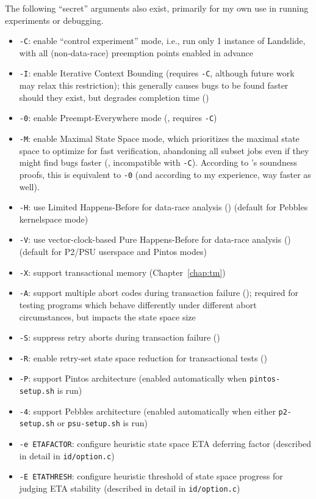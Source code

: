 The following ``secret'' arguments also exist, primarily for my own use in running experiments or debugging.

\begin{itemize}
	\item {\tt -C}: enable ``control experiment'' mode, i.e., run only 1 instance of Landslide, with all (non-data-race) preemption points enabled in advance
	\item {\tt -I}: enable Iterative Context Bounding (requires {\tt -C}, although future work may relax this restriction);
		this generally causes bugs to be found faster should they exist, but degrades completion time
		(\sect{\ref{sec:landslide-icb}})
	\item {\tt -0}: enable Preempt-Everywhere mode (\sect{\ref{sec:quicksand-eval}}, requires {\tt -C})
	\item {\tt -M}: enable Maximal State Space mode,
		which prioritizes the maximal state space to optimize for fast verification,
		abandoning all subset jobs even if they might find bugs faster
		(\sect{\ref{sec:tm-eval}}, incompatible with {\tt -C}).
		According to \sect{\ref{sec:quicksand-soundness}}'s soundness proofs,
		this is equivalent to {\tt -0}
		(and according to my experience, way faster as well).
	\item {\tt -H}: use Limited Happens-Before for data-race analysis (\sect{\ref{sec:background-hb}})
		(default for Pebbles kernelspace mode)
	\item {\tt -V}: use vector-clock-based Pure Happens-Before for data-race analysis (\sect{\ref{sec:background-hb}})
		(default for P2/PSU userspace and Pintos modes)
	\item {\tt -X}: support transactional memory (Chapter~\ref{chap:tm})
	\item {\tt -A}: support multiple abort codes during transaction failure (\sect{\ref{sec:tm-implementation}});
		required for testing programs which behave differently under different abort circumstances,
		but impacts the state space size
	\item {\tt -S}: suppress retry aborts during transaction failure (\sect{\ref{sec:tm-implementation}})
	\item {\tt -R}: enable retry-set state space reduction for transactional tests (\sect{\ref{sec:tm-implementation}})
	\item {\tt -P}: support Pintos architecture (enabled automatically when {\tt pintos-setup.sh} is run)
	\item {\tt -4}: support Pebbles architecture (enabled automatically when either {\tt p2-setup.sh} or {\tt psu-setup.sh} is run)
	\item {\tt -e ETAFACTOR}: configure heuristic state space ETA deferring factor (described in detail in {\tt id/option.c})
	\item {\tt -E ETATHRESH}: configure heuristic threshold of state space progress for judging ETA stability (described in detail in {\tt id/option.c})
\end{itemize}

